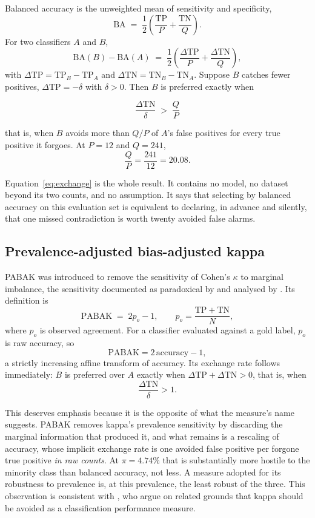 Balanced accuracy \citep{brodersen2010balanced} is the unweighted mean of
sensitivity and specificity,
\[
\mathrm{BA} \;=\; \frac{1}{2}\!\left(\frac{\mathrm{TP}}{P} +
\frac{\mathrm{TN}}{Q}\right).
\]
For two classifiers $A$ and $B$,
\[
\mathrm{BA}(B) - \mathrm{BA}(A) \;=\;
\frac{1}{2}\!\left(\frac{\Delta\mathrm{TP}}{P} +
\frac{\Delta\mathrm{TN}}{Q}\right),
\]
with $\Delta\mathrm{TP} = \mathrm{TP}_B - \mathrm{TP}_A$ and
$\Delta\mathrm{TN} = \mathrm{TN}_B - \mathrm{TN}_A$. Suppose $B$ catches fewer
positives, $\Delta\mathrm{TP} = -\delta$ with $\delta > 0$. Then $B$ is
preferred exactly when

\begin{equation}
\boxed{\;\frac{\Delta\mathrm{TN}}{\delta} \;>\; \frac{Q}{P}\;}
\label{eq:exchange}
\end{equation}

that is, when $B$ avoids more than $Q/P$ of $A$'s false positives for every true
positive it forgoes. At $P = 12$ and $Q = 241$,
\[
\frac{Q}{P} = \frac{241}{12} = 20.08 .
\]

Equation~\eqref{eq:exchange} is the whole result. It contains no model, no
dataset beyond its two counts, and no assumption. It says that selecting by
balanced accuracy on this evaluation set is equivalent to declaring, in advance
and silently, that one missed contradiction is worth twenty avoided false
alarms.

\subsection{Prevalence-adjusted bias-adjusted kappa}

PABAK \citep{byrt1993pabak} was introduced to remove the sensitivity of Cohen's
$\kappa$ \citep{cohen1960kappa} to marginal imbalance, the sensitivity
documented as paradoxical by \citet{feinstein1990paradoxes} and analysed by
\citet{cicchetti1990resolving}. Its definition is
\[
\mathrm{PABAK} \;=\; 2 p_o - 1, \qquad
p_o = \frac{\mathrm{TP} + \mathrm{TN}}{N},
\]
where $p_o$ is observed agreement. For a classifier evaluated against a gold
label, $p_o$ is raw accuracy, so
\[
\mathrm{PABAK} = 2\,\mathrm{accuracy} - 1 ,
\]
a strictly increasing affine transform of accuracy. Its exchange rate follows
immediately: $B$ is preferred over $A$ exactly when
$\Delta\mathrm{TP} + \Delta\mathrm{TN} > 0$, that is, when
\[
\frac{\Delta\mathrm{TN}}{\delta} > 1 .
\]

This deserves emphasis because it is the opposite of what the measure's name
suggests. PABAK removes kappa's prevalence sensitivity by discarding the
marginal information that produced it, and what remains is a rescaling of
accuracy, whose implicit exchange rate is one avoided false positive per
forgone true positive \emph{in raw counts}. At $\pi = 4.74\%$ that is
substantially more hostile to the minority class than balanced accuracy, not
less. A measure adopted for its robustness to prevalence is, at this prevalence,
the least robust of the three. This observation is consistent with
\citet{delgado2019kappa}, who argue on related grounds that kappa should be
avoided as a classification performance measure.


